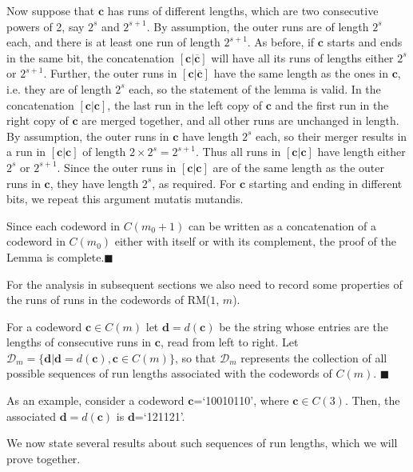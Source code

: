 Now suppose that $\mathbf{c}$ has runs of different lengths, which
are two consecutive powers of 2, say $2^s$ and $2^{s+1}$. By
assumption, the outer runs are of length $2^s$ each, and there is
at least one run of length $2^{s+1}$. As before, if $\mathbf{c}$
starts and ends in the same bit, the concatenation $[\mathbf{c} |
\mathbf{\overline{c}}]$ will have all its runs of lengths either
$2^s$ or $2^{s+1}$. Further, the outer runs in $[\mathbf{c} |
\mathbf{\overline{c}}]$ have the same length as the ones in
$\mathbf{c}$, i.e. they are of length $2^s$ each, so the statement
of the lemma is valid. In the concatenation $[\mathbf{c}
|\mathbf{c}]$, the last run in the left copy of $\mathbf{c}$ and
the first run in the right copy of $\mathbf{c}$ are merged
together, and all other runs are unchanged in length. By
assumption, the outer runs in $\mathbf{c}$ have length $2^s$ each,
so their merger results in a run in $[\mathbf{c} | \mathbf{c}]$ of
length $2 \times 2^s=2^{s+1}$. Thus all runs in $[\mathbf{c} |
\mathbf{c}]$ have length either $2^s$ or $2^{s+1}$. Since the
outer runs in $[\mathbf{c} |\mathbf{c}]$ are of the same length as
the outer runs in $\mathbf{c}$, they have length $2^s$, as
required. For $\mathbf{c}$ starting and ending in different bits,
we repeat this argument mutatis mutandis.

Since each
codeword in $C(m_0+1)$ can be written as a concatenation of a
codeword in $C(m_0)$ either with itself or with its complement,
the proof of the Lemma is complete.\hfill $\blacksquare$

For the analysis in subsequent sections we also
need to record some properties of the runs
of runs in the codewords of RM($1$, $m$).

\begin{definition}  \label{de11}
For a codeword $\mathbf{c} \in C(m)$ let $\mathbf{d}=d(\mathbf{c})$ be the
string whose entries are the lengths of consecutive runs in
$\mathbf{c}$, read from left to right.
Let $\mathcal{D}_m = \{\mathbf{d} | \mathbf{d}=d(\mathbf{c}),\mathbf{c} \in
C(m)\}$,
so that $\mathcal{D}_m$ represents the collection of all possible sequences of
run
lengths associated with the codewords of $C(m)$.
\hfill $\blacksquare$
\end{definition}

As an example, consider a codeword $\mathbf{c}$=`10010110', where
$\mathbf{c} \in C(3)$. Then, the associated
$\mathbf{d}=d(\mathbf{c})$ is $\mathbf{d}$=`121121'.

We now state several results about such
sequences of run lengths, which we will
prove together.

